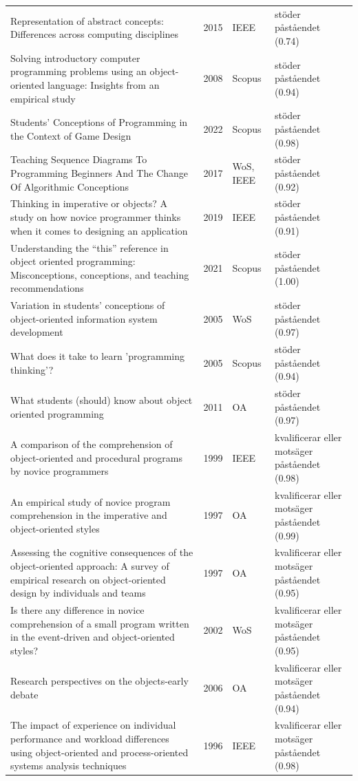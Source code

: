 \begin{longtable}{@{}%
  >{\raggedright\arraybackslash}p{}c%
  >{\raggedright\arraybackslash}p{}%
  >{\raggedright\arraybackslash}p{}@{}}
Representation of abstract concepts: Differences across computing disciplines & 2015 & IEEE & stöder påståendet (0.74) \\
Solving introductory computer programming problems using an object-oriented language: Insights from an empirical study & 2008 & Scopus & stöder påståendet (0.94) \\
Students' Conceptions of Programming in the Context of Game Design & 2022 & Scopus & stöder påståendet (0.98) \\
Teaching Sequence Diagrams To Programming Beginners And The Change Of Algorithmic Conceptions & 2017 & WoS, IEEE & stöder påståendet (0.92) \\
Thinking in imperative or objects? A study on how novice programmer thinks when it comes to designing an application & 2019 & IEEE & stöder påståendet (0.91) \\
Understanding the ``this'' reference in object oriented programming: Misconceptions, conceptions, and teaching recommendations & 2021 & Scopus & stöder påståendet (1.00) \\
Variation in students' conceptions of object-oriented information system development & 2005 & WoS & stöder påståendet (0.97) \\
What does it take to learn 'programming thinking'? & 2005 & Scopus & stöder påståendet (0.94) \\
What students (should) know about object oriented programming & 2011 & OA & stöder påståendet (0.97) \\
A comparison of the comprehension of object-oriented and procedural programs by novice programmers & 1999 & IEEE & kvalificerar eller motsäger påståendet (0.98) \\
An empirical study of novice program comprehension in the imperative and object-oriented styles & 1997 & OA & kvalificerar eller motsäger påståendet (0.99) \\
Assessing the cognitive consequences of the object-oriented approach: A survey of empirical research on object-oriented design by individuals and teams & 1997 & OA & kvalificerar eller motsäger påståendet (0.95) \\
Is there any difference in novice comprehension of a small program written in the event-driven and object-oriented styles? & 2002 & WoS & kvalificerar eller motsäger påståendet (0.95) \\
Research perspectives on the objects-early debate & 2006 & OA & kvalificerar eller motsäger påståendet (0.94) \\
The impact of experience on individual performance and workload differences using object-oriented and process-oriented systems analysis techniques & 1996 & IEEE & kvalificerar eller motsäger påståendet (0.98) \\
\end{longtable}
\endgroup
